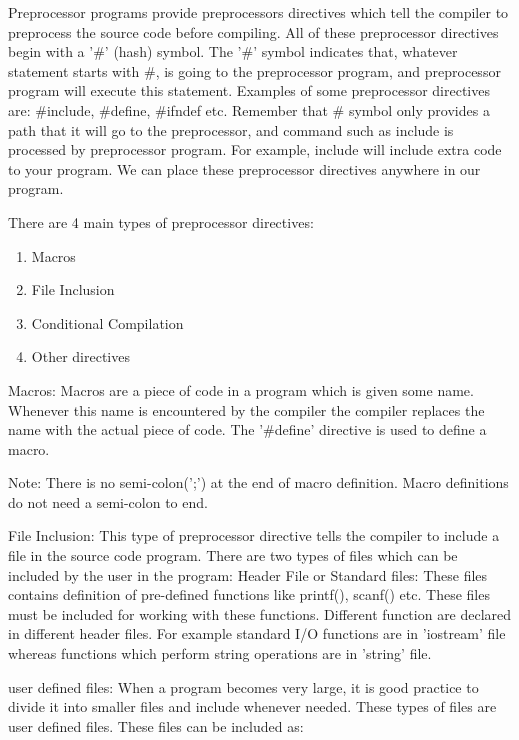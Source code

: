 \par Preprocessor programs provide preprocessors directives which tell the compiler to preprocess the source code before compiling. All of these preprocessor directives begin with a '\#' (hash) symbol. The '\#' symbol indicates that, whatever statement starts with \#, is going to the preprocessor program, and preprocessor program will execute this statement. Examples of some preprocessor directives are: \#include, \#define, \#ifndef etc. Remember that \# symbol only provides a path that it will go to the preprocessor, and command such as include is processed by preprocessor program. For example, include will include extra code to your program. We can place these preprocessor directives anywhere in our program. 

There are 4 main types of preprocessor directives: 
\begin{enumerate}
    \item Macros
    \item File Inclusion
    \item Conditional Compilation
    \item Other directives
\end{enumerate} 

Macros: Macros are a piece of code in a program which is given some name. Whenever this name is encountered by the compiler the compiler replaces the name with the actual piece of code. The '\#define' directive is used to define a macro. 

\begin{highlight}
    Note: There is no semi-colon(';') at the end of macro definition. Macro definitions do not need a semi-colon to end.
\end{highlight}


File Inclusion: This type of preprocessor directive tells the compiler to include a file in the source code program. There are two types of files which can be included by the user in the program: 
    Header File or Standard files: These files contains definition of pre-defined functions like printf(), scanf() etc. These files must be included for working with these functions. Different function are declared in different header files. For example standard I/O functions are in 'iostream' file whereas functions which perform string operations are in 'string' file.
    
    user defined files: When a program becomes very large, it is good practice to divide it into smaller files and include whenever needed. These types of files are user defined files. These files can be included as:


